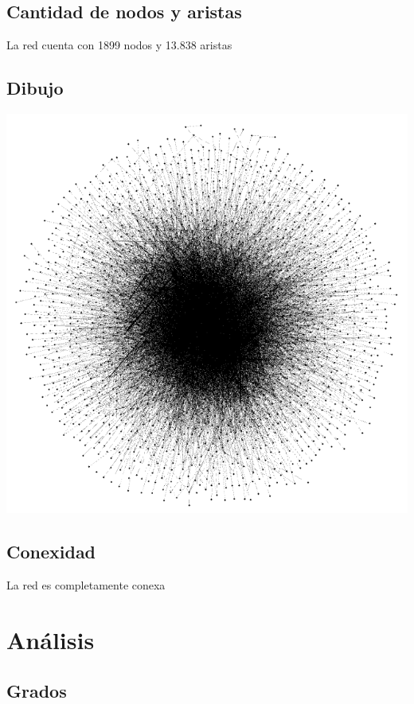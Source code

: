 \documentclass[12pt]{article}
\begin{document}
\subsection{Cantidad de nodos y aristas}
La red cuenta con 1899 nodos y 13.838 aristas

\subsection{Dibujo}
\begin{center}
    \includegraphics[scale=0.4]{images/dibujo_red.png}
\end{center}

\subsection{Conexidad}
La red es completamente conexa
\section{Análisis}

\subsection{Grados}
\end{document}

